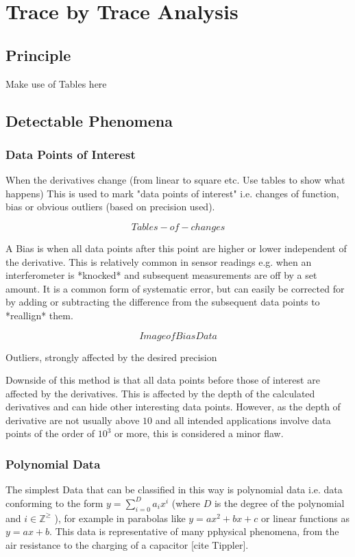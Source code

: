 \documentclass[main.tex]{subfiles}
\begin{document}
  \section{Trace by Trace Analysis}
  \subsection{Principle}
  Make use of Tables here
  
  \subsection{Detectable Phenomena}
  
  \subsubsection{Data Points of Interest}
  When the derivatives change (from linear to square etc. Use tables to show what happens) This is used to mark "data points of interest" i.e. changes of function, bias or obvious outliers (based on precision used).
  
  \[Tables-of-changes\]
  
  A Bias is when all data points after this point are higher or lower independent of the derivative. This is relatively common in sensor readings e.g. when an interferometer is *knocked* and subsequent measurements are off by a set amount. It is a common form of systematic error, but can easily be corrected for by adding or subtracting the difference from the subsequent data points to *reallign* them.
  
  \[Image of Bias Data\]
  
  Outliers,  strongly affected by the desired precision
  
  Downside of this method is that all data points before those of interest are affected by the derivatives. This is affected by the depth of the calculated derivatives and can hide other interesting data points. However, as the depth of derivative are not usually above $10$ and all intended applications involve data points of the order of $10^3$ or more, this is considered a minor flaw.
  
  \subsubsection{Polynomial Data}
  
  The simplest Data that can be classified in this way is polynomial data i.e. data conforming to the form $y= \sum_{i=0}^{D} a_i x^i$ (where $D$ is the degree of the polynomial and \( i \in \mathbb{Z}^\geq \) ), for example in parabolas like $y=a x^2 + b x +c$ or linear functions as $y=a x + b$. This data is representative of many pphysical phenomena, from the air resistance to the charging of a capacitor [cite Tippler].
  
\end{document}
